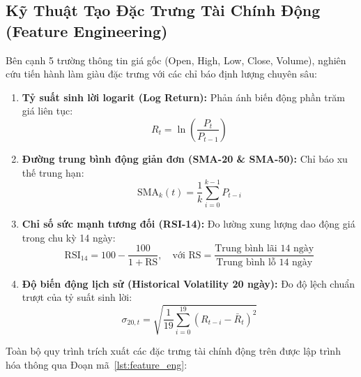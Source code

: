 \documentclass[12pt,a4paper]{report}
\begin{document}
\subsection{Kỹ Thuật Tạo Đặc Trưng Tài Chính Động (Feature Engineering)}
Bên cạnh 5 trường thông tin giá gốc (Open, High, Low, Close, Volume), nghiên cứu tiến hành làm giàu đặc trưng với các chỉ báo định lượng chuyên sâu:
\begin{enumerate}
    \item \textbf{Tỷ suất sinh lời logarit (Log Return):} Phản ánh biến động phần trăm giá liên tục:
    \begin{equation}
        R_t = \ln\left(\frac{P_t}{P_{t-1}}\right)
    \end{equation}
    \item \textbf{Đường trung bình động giản đơn (SMA-20 \& SMA-50):} Chỉ báo xu thế trung hạn:
    \begin{equation}
        \text{SMA}_k(t) = \frac{1}{k} \sum_{i=0}^{k-1} P_{t-i}
    \end{equation}
    \item \textbf{Chỉ số sức mạnh tương đối (RSI-14):} Đo lường xung lượng dao động giá trong chu kỳ 14 ngày:
    \begin{equation}
        \text{RSI}_{14} = 100 - \frac{100}{1 + \text{RS}}, \quad \text{với } \text{RS} = \frac{\text{Trung bình lãi 14 ngày}}{\text{Trung bình lỗ 14 ngày}}
    \end{equation}
    \item \textbf{Độ biến động lịch sử (Historical Volatility 20 ngày):} Đo độ lệch chuẩn trượt của tỷ suất sinh lời:
    \begin{equation}
        \sigma_{20, t} = \sqrt{\frac{1}{19} \sum_{i=0}^{19} (R_{t-i} - \bar{R}_t)^2}
    \end{equation}
\end{enumerate}

Toàn bộ quy trình trích xuất các đặc trưng tài chính động trên được lập trình hóa thông qua Đoạn mã~\ref{lst:feature_eng}:
\end{document}
